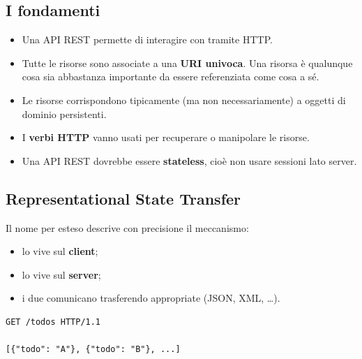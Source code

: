 \subsection{I fondamenti}

\begin{itemize}
  \item Una API REST permette di interagire con  tramite HTTP.
  \item Tutte le risorse sono associate a una \textbf{URI univoca}.
        \guillemotleft Una risorsa è qualunque cosa sia abbastanza importante da essere
        referenziata come cosa a sé\guillemotright.
  \item Le risorse corrispondono tipicamente (ma non necessariamente) a oggetti
        di dominio persistenti.
  \item I \textbf{verbi HTTP} vanno usati per recuperare o manipolare le
        risorse.
  \item Una API REST dovrebbe essere \textbf{stateless}, cioè non usare sessioni
        lato server.
\end{itemize}


\subsection{Representational State Transfer}

Il nome per esteso descrive con precisione il meccanismo:

\begin{itemize}
  \item lo  vive sul \textbf{client};
  \item lo  vive sul \textbf{server};
  \item i due comunicano trasferendo  appropriate (JSON,
        XML, \ldots).
\end{itemize}

\begin{lstlisting}[style=http, name=Scambio REST]
GET /todos HTTP/1.1

[{"todo": "A"}, {"todo": "B"}, ...]
\end{lstlisting}

